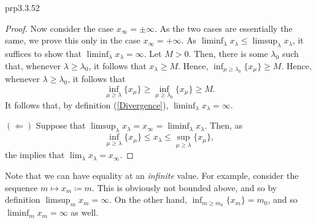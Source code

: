 \begin{prp}{}{prp3.3.52}
\begin{proof}
Now consider the case $x_{\infty}=\pm \infty$.  As the two cases are essentially the same, we prove this only in the case $x_{\infty}=+\infty$.  As $\liminf _{\lambda}x_{\lambda}\leq \limsup _{\lambda}x_{\lambda}$, it suffices to show that $\liminf _{\lambda}x_{\lambda}=\infty$.  Let $M>0$.  Then, there is some $\lambda _0$ such that, whenever $\lambda \geq \lambda _0$, it follows that $x_{\lambda}\geq M$.  Hence, $\inf _{\mu \geq \lambda _0}\{ x_{\mu }\} \geq M$.  Hence, whenever $\lambda \geq \lambda _0$, it follows that
\begin{equation}
\inf _{\mu \geq \lambda}\{ x_{\mu}\} \geq \inf _{\mu \geq \lambda _0}\{ x_{\mu}\} \geq M.
\end{equation}
It follows that, by definition (\cref{Divergence}), $\liminf _{\lambda}x_{\lambda}=\infty$.

\blankline
\noindent
$(\Leftarrow )$ Suppose that $\limsup _\lambda x_\lambda =x_{\infty}=\liminf _\lambda x_\lambda$.  Then, as
\begin{equation}
\inf _{\mu \geq \lambda}\{ x_{\mu}\} \leq x_{\lambda}\leq \sup _{\mu \geq \lambda}\{ x_{\mu}\} ,
\end{equation}
the  implies that $\lim _{\lambda}x_{\lambda}=x_{\infty}$.
\end{proof}
\end{prp}
\begin{exm}{}{}
Note that we can have equality at an \emph{infinite} value.  For example, consider the sequence $m\mapsto x_m\coloneqq m$.  This is obviously not bounded above, and so by definition $\limsup _mx_m=\infty$.  On the other hand, $\inf _{m\geq m_0}\{ x_m\} =m_0$, and so $\liminf _mx_m=\infty$ as well.
\end{exm}

\horizontalrule

